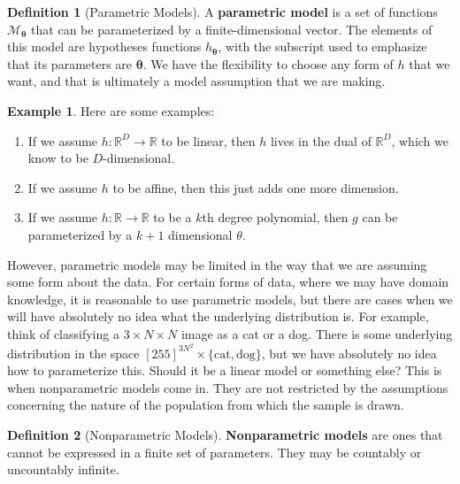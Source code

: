 \documentclass{article}
\theoremstyle{definition}
\newtheorem{example}{Example}[section]
\newtheorem{definition}{Definition}[section]
\begin{document}
    \begin{definition}[Parametric Models]
      A \textbf{parametric model} is a set of functions $\mathcal{M}_{\boldsymbol{\theta}}$ that can be parameterized by a finite-dimensional vector. The elements of this model are hypotheses functions $h_{\boldsymbol{\theta}}$, with the subscript used to emphasize that its parameters are $\boldsymbol{\theta}$. We have the flexibility to choose any form of $h$ that we want, and that is ultimately a model assumption that we are making. 
    \end{definition}

    \begin{example}
      Here are some examples: 
      \begin{enumerate}
        \item If we assume $h: \mathbb{R}^D \rightarrow \mathbb{R}$ to be linear, then $h$ lives in the dual of $\mathbb{R}^D$, which we know to be $D$-dimensional. 
        \item If we assume $h$ to be affine, then this just adds one more dimension. 
        \item If we assume $h: \mathbb{R} \rightarrow \mathbb{R}$ to be a $k$th degree polynomial, then $g$ can be parameterized by a $k+1$ dimensional $\theta$. 
      \end{enumerate}
    \end{example}

    However, parametric models may be limited in the way that we are assuming some form about the data. For certain forms of data, where we may have domain knowledge, it is reasonable to use parametric models, but there are cases when we will have absolutely no idea what the underlying distribution is. For example, think of classifying a $3 \times N \times N$ image as a cat or a dog. There is some underlying distribution in the space $[255]^{3 N^2} \times \{\text{cat}, \text{dog}\}$, but we have absolutely no idea how to parameterize this. Should it be a linear model or something else? This is when nonparametric models come in. They are not restricted by the assumptions concerning the nature of the population from which the sample is drawn. 

    \begin{definition}[Nonparametric Models]
      \textbf{Nonparametric models} are ones that cannot be expressed in a finite set of parameters. They may be countably or uncountably infinite. 
    \end{definition}
\end{document}
